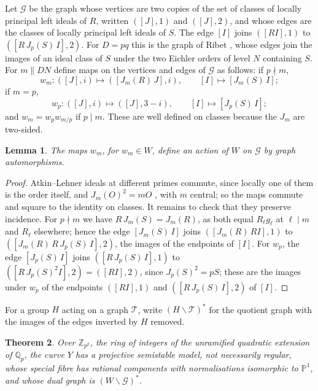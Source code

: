 \documentclass[11pt]{amsart}
\theoremstyle{plain}
\newtheorem{theorem}{Theorem}[section]
\newtheorem{lemma}[theorem]{Lemma}
\theoremstyle{remark}
\newcommand{\Z}{\mathbb{Z}}
\newcommand{\Qp}{\mathbb{Q}_p}
\begin{document}
Let $\mathcal{G}$ be the graph whose vertices are two copies of the set of classes of locally principal left ideals of $R$, written $([J], 1)$ and $([J], 2)$, and whose edges are the classes of locally principal left ideals of $S$. The edge $[I]$ joins $([RI], 1)$ to $([R\,J_p(S)\,I], 2)$. For $D = pq$ this is the graph of Ribet \cite[Proposition~4.4]{Rib}, whose edges join the images of an ideal class of $S$ under the two Eichler orders of level $N$ containing $S$. For $m \parallel DN$ define maps on the vertices and edges of $\mathcal{G}$ as follows: if $p \nmid m$,
\[
w_m\colon ([J], i) \mapsto ([J_m(R)\,J], i), \qquad [I] \mapsto [J_m(S)\,I];
\]
if $m = p$,
\[
w_p\colon ([J], i) \mapsto ([J], 3 - i), \qquad [I] \mapsto [J_p(S)\,I];
\]
and $w_m = w_p w_{m/p}$ if $p \mid m$. These are well defined on classes because the $J_m$ are two-sided.

\begin{lemma}\label{lem:action}
The maps $w_m$, for $w_m \in W$, define an action of $W$ on $\mathcal{G}$ by graph automorphisms.
\end{lemma}

\begin{proof}
Atkin--Lehner ideals at different primes commute, since locally one of them is the order itself, and $J_m(O)^2 = mO$ \cite[Proposition~23.4.14, Theorem~13.3.11]{Voi}, with $m$ central; so the maps commute and square to the identity on classes. It remains to check that they preserve incidence. For $p \nmid m$ we have $R\,J_m(S) = J_m(R)$, as both equal $R_\ell g_\ell$ at $\ell \mid m$ and $R_\ell$ elsewhere; hence the edge $[J_m(S)\,I]$ joins $([J_m(R)\,RI], 1)$ to $([J_m(R)\,R\,J_p(S)\,I], 2)$, the images of the endpoints of $[I]$. For $w_p$, the edge $[J_p(S)\,I]$ joins $([R\,J_p(S)\,I], 1)$ to $([R\,J_p(S)^2 I], 2) = ([RI], 2)$, since $J_p(S)^2 = pS$; these are the images under $w_p$ of the endpoints $([RI],1)$ and $([R\,J_p(S)\,I],2)$ of $[I]$.
\end{proof} For a group $H$ acting on a graph $\mathcal{T}$, write $(H\backslash\mathcal{T})^*$ for the quotient graph with the images of the edges inverted by $H$ removed.

\begin{theorem}\label{thm:main}
Over $\Z_{p^2}$, the ring of integers of the unramified quadratic extension of $\Qp$, the curve $Y$ has a projective semistable model, not necessarily regular, whose special fibre has rational components with normalisations isomorphic to $\mathbb{P}^1$, and whose dual graph is $(W\backslash\mathcal{G})^*$.
\end{theorem}
\end{document}
